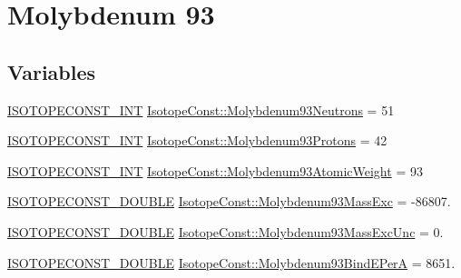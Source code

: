 \hypertarget{group___isotope_const-_molybdenum-_mo93}{}\section{Molybdenum 93}
\label{group___isotope_const-_molybdenum-_mo93}
\subsection*{Variables}
\begin{DoxyCompactItemize}
\item 
\mbox{\hyperlink{group___isotope_const-_macros_ga5f18360b3e99483a35c32d789e62621c}{I\+S\+O\+T\+O\+P\+E\+C\+O\+N\+S\+T\+\_\+\+I\+NT}} \mbox{\hyperlink{group___isotope_const-_molybdenum-_mo93_ga9ec01d28e93231ce514bea8ef4f78f03}{Isotope\+Const\+::\+Molybdenum93\+Neutrons}} = 51
\item 
\mbox{\hyperlink{group___isotope_const-_macros_ga5f18360b3e99483a35c32d789e62621c}{I\+S\+O\+T\+O\+P\+E\+C\+O\+N\+S\+T\+\_\+\+I\+NT}} \mbox{\hyperlink{group___isotope_const-_molybdenum-_mo93_ga2c084b8597a75af2565fd2182cbd68ce}{Isotope\+Const\+::\+Molybdenum93\+Protons}} = 42
\item 
\mbox{\hyperlink{group___isotope_const-_macros_ga5f18360b3e99483a35c32d789e62621c}{I\+S\+O\+T\+O\+P\+E\+C\+O\+N\+S\+T\+\_\+\+I\+NT}} \mbox{\hyperlink{group___isotope_const-_molybdenum-_mo93_ga5995f206fdd15054687f065dc3fdd6ea}{Isotope\+Const\+::\+Molybdenum93\+Atomic\+Weight}} = 93
\item 
\mbox{\hyperlink{group___isotope_const-_macros_ga8f45a7272ce02c0b4c65c44636ed719a}{I\+S\+O\+T\+O\+P\+E\+C\+O\+N\+S\+T\+\_\+\+D\+O\+U\+B\+LE}} \mbox{\hyperlink{group___isotope_const-_molybdenum-_mo93_gad2f8e5694f1ca3c35b7d752aa375ca4c}{Isotope\+Const\+::\+Molybdenum93\+Mass\+Exc}} = -\/86807.
\item 
\mbox{\hyperlink{group___isotope_const-_macros_ga8f45a7272ce02c0b4c65c44636ed719a}{I\+S\+O\+T\+O\+P\+E\+C\+O\+N\+S\+T\+\_\+\+D\+O\+U\+B\+LE}} \mbox{\hyperlink{group___isotope_const-_molybdenum-_mo93_ga03ef0ad65ba1d46037d40d9301748dd6}{Isotope\+Const\+::\+Molybdenum93\+Mass\+Exc\+Unc}} = 0.
\item 
\mbox{\hyperlink{group___isotope_const-_macros_ga8f45a7272ce02c0b4c65c44636ed719a}{I\+S\+O\+T\+O\+P\+E\+C\+O\+N\+S\+T\+\_\+\+D\+O\+U\+B\+LE}} \mbox{\hyperlink{group___isotope_const-_molybdenum-_mo93_ga10e74427d2bddb045cbc1b362f186c36}{Isotope\+Const\+::\+Molybdenum93\+Bind\+E\+PerA}} = 8651.
\item 

\end{DoxyCompactItemize}
